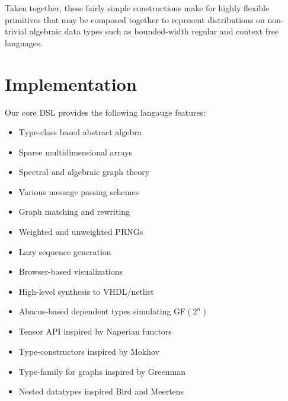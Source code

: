 \documentclass[sigplan,10pt,review,anonymous]{acmart}
\begin{document}
Taken together, these fairly simple constructions make for highly flexible primitives that may be composed together to represent distributions on non-trivial algebraic data types such as bounded-width regular and context free languages.



%

\section{Implementation}

Our core DSL provides the following langauge features:

\begin{itemize}
  \item Type-class based abstract algebra
  \item Sparse multidimensional arrays
  \item Spectral and algebraic graph theory
  \item Various message passing schemes
  \item Graph matching and rewriting
  \item Weighted and unweighted PRNGs
  \item Lazy sequence generation
  \item Browser-based visualizations
  \item High-level synthesis to VHDL/netlist
  \item Abacus-based dependent types simulating GF$(2^n)$
  \item Tensor API inspired by Naperian functors~\citep{gibbons2017aplicative}
  \item Type-constructors inspired by Mokhov~\citep{mokhov2017algebraic}
  \item Type-family for graphs inspired by Greenman ~\citep{greenman2014getting}
  \item Nested datatypes inspired Bird and Meertens~\cite{bird1998nested}
\end{itemize}
\end{document}
